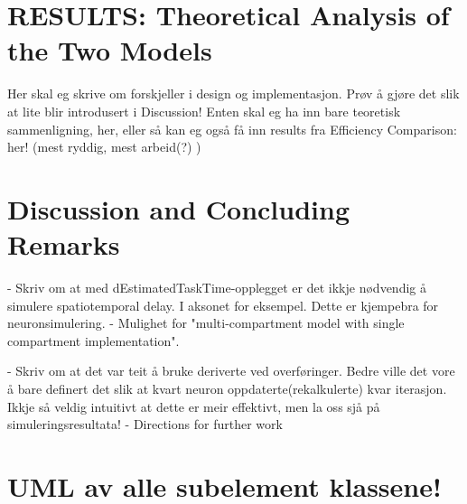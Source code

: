\documentclass[b5paper,12 pt]{report}
\begin{document}
	\chapter{RESULTS: Theoretical Analysis of the Two Models} %
		Her skal eg skrive om forskjeller i design og implementasjon.
			Prøv å gjøre det slik at lite blir introdusert i Discussion!
		Enten skal eg ha inn bare teoretisk sammenligning, her, eller så kan eg også få inn results fra Efficiency Comparison: her! (mest ryddig, mest arbeid(?) )

	\chapter{Discussion and Concluding Remarks}
	\label{chapDiscussion}
 		- Skriv om at med dEstimatedTaskTime-opplegget er det ikkje nødvendig å simulere spatiotemporal delay. I aksonet for eksempel. Dette er kjempebra for neuronsimulering.
		- Mulighet for "multi-compartment model with single compartment implementation".
		
		- Skriv om at det var teit å bruke deriverte ved overføringer. Bedre ville det vore å bare definert det slik at kvart neuron oppdaterte(rekalkulerte) kvar iterasjon. 
			Ikkje så veldig intuitivt at dette er meir effektivt, men la oss sjå på simuleringsresultata!
		- Directions for further work

% 	

\appendix
	
	
	\chapter{UML av alle subelement klassene!} 			%
		\label{appendixUMLofAllNodeSubelementClasses}  	%



%

\end{document}
